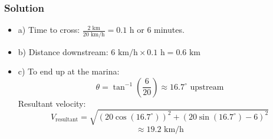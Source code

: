 \documentclass{article}
\begin{document}
\begin{multicols}{2}

\columnbreak

\subsubsection*{Solution}
\begin{itemize}
    \item a) Time to cross: \( \frac{2 \text{ km}}{20 \text{ km/h}} = 0.1 \text{ h} \) or 6 minutes.
    \item b) Distance downstream: \( 6 \text{ km/h} \times 0.1 \text{ h} = 0.6 \text{ km} \)
    \item c) To end up at the marina:
        \[
        \theta = \tan^{-1} \left( \frac{6}{20} \right) \approx 16.7^\circ \text{ upstream}
        \]
        Resultant velocity:
        \[
        V_{\text{resultant}} = \sqrt{(20 \cos(16.7^\circ))^2 + (20 \sin(16.7^\circ) - 6)^2} 
        \]
        \[
        \approx 19.2 \text{ km/h}
        \]
\end{itemize}

\end{multicols}
\end{document}
